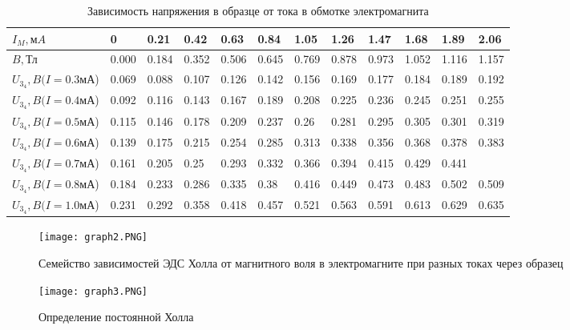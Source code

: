 \documentclass[a4paper]{article}
\begin{document}
    \begin{table}[h]
    \centering
    \begin{center}
    \caption{Зависимость напряжения в образце от тока в обмотке электромагнита}
    \end{center}
    \vspace{0.1cm}
    \label{tab:my_label}
    \begin{tabular}{ |p{3cm}||p{0.7cm}|p{0.7cm}|p{0.7cm}|p{0.7cm}|p{0.7cm}|p{0.7cm}|p{0.7cm}|p{0.7cm}|p{0.7cm}|p{0.7cm}|p{0.7cm}|  }
 \hline
$I_M, мA$ & 0 & 0.21 & 0.42 & 0.63 & 0.84 & 1.05 & 1.26 & 1.47 & 1.68 & 1.89 & 2.06\\
 \hline
 $B, $Тл & 0.000 & 0.184 & 0.352 & 0.506 & 0.645 & 0.769 & 0.878 & 0.973 & 1.052 & 1.116 & 1.157\\
 \hline
 \hline
$U_3_4, B (I = 0.3$мА) & 0.069 & 0.088 & 0.107 & 0.126 & 0.142 & 0.156 & 0.169 & 0.177 & 0.184 & 0.189 & 0.192\\
\hline
$U_3_4, B (I = 0.4$мА) & 0.092 & 0.116 & 0.143 & 0.167 & 0.189 & 0.208 & 0.225 & 0.236 & 0.245 & 0.251 & 0.255\\
\hline
$U_3_4, B (I = 0.5$мА) & 0.115 & 0.146 & 0.178 & 0.209 & 0.237 & 0.26 & 0.281 & 0.295 & 0.305 & 0.301 & 0.319\\
\hline
$U_3_4, B (I = 0.6$мА) & 0.139 & 0.175 & 0.215 & 0.254 & 0.285 & 0.313 & 0.338 & 0.356 & 0.368 & 0.378 & 0.383\\
\hline
$U_3_4, B (I = 0.7$мА) & 0.161 & 0.205 & 0.25 & 0.293 & 0.332 & 0.366 & 0.394 & 0.415 & 0.429 & 0.441  &  \\
\hline
$U_3_4, B (I = 0.8$мА) & 0.184 & 0.233 & 0.286 & 0.335 & 0.38 & 0.416 & 0.449 & 0.473 & 0.483 & 0.502 & 0.509\\
\hline
$U_3_4, B (I = 1.0$мА) & 0.231 & 0.292 & 0.358 & 0.418 & 0.457 & 0.521 & 0.563 & 0.591 & 0.613 & 0.629 & 0.635\\
\hline
\hline

 \end{tabular}
\end{table}

\begin{figure}[h]
    \centering
    \texttt{[image: graph2.PNG]}
    \caption{Семейство зависимостей ЭДС Холла от магнитного воля в электромагните при разных токах через образец}
    \label{fig:vac}
\end{figure}
\par

\begin{figure}[h]
    \centering
    \texttt{[image: graph3.PNG]}
    \caption{Определение постоянной Холла}
    \label{fig:vac}
\end{figure}
\end{document}
